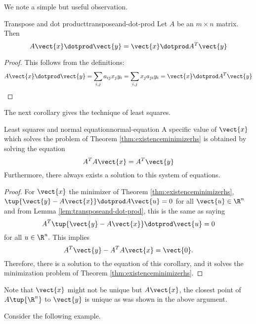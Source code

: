 We note a simple but useful observation.

\begin{lemma}{Transpose and dot product}{transposeand-dot-prod}
Let $A$ be an $m\times n$ matrix. Then 
\begin{equation*}
A\vect{x} \dotprod \vect{y} = \vect{x}\dotprod A^T\vect{y} 
\end{equation*}
\end{lemma}

\begin{proof}
This follows from the definitions:
\[ A\vect{x} \dotprod \vect{y}=\sum_{i,j}a_{ij}x_{j} y_{i}
=\sum_{i,j}x_{j} a_{ji} y_{i}= \vect{x} \dotprod A^T\vect{y}
\] \end{proof}

The next corollary gives the technique of least squares.

\begin{corollary}{Least squares and normal equation}{normal-equation}
A specific value of $\vect{x}$ which solves the problem of Theorem 
\ref{thm:existenceminimizerhs} is obtained by solving the equation
\begin{equation*}
A^TA\vect{x}=A^T\vect{y}
\end{equation*}
Furthermore, there always exists a solution to this system of equations.
\end{corollary}

\begin{proof} 
For $\vect{x}$ the minimizer of Theorem \ref{thm:existenceminimizerhs}, $\tup{
\vect{y}-A\vect{x}} \dotprod A \vect{u} =0$ for all $\vect{u} \in \R^{n}$ and from
Lemma \ref{lem:transposeand-dot-prod}, this is the same as saying
\begin{equation*}
A^T\tup{\vect{y}-A\vect{x}} \dotprod \vect{u}=0
\end{equation*}
for all $u \in \R^{n}.$ This implies 
\begin{equation*}
A^T\vect{y}-A^TA\vect{x}=\vect{0}.
\end{equation*}
Therefore, there is a solution to the equation of this corollary, and it
solves the minimization problem of Theorem \ref{thm:existenceminimizerhs}.
\end{proof}

Note that $\vect{x}$ might not be unique but $A\vect{x}$, the closest
point of $A\tup{\R^{n}}$ to $\vect{y}$ is unique as was shown in the
above argument. 

Consider the following example. 

